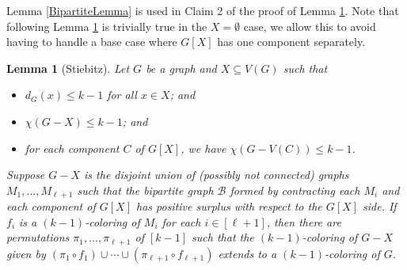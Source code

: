 \documentclass[12pt]{article}
\theoremstyle{plain}
\newtheorem{lem}[thm]{Lemma}
\theoremstyle{definition}
\theoremstyle{remark}
\newcommand{\fancy}[1]{\mathcal{#1}}
\newcommand{\B}{\fancy{B}}
\newcommand{\irange}[1]{\left[#1\right]}
\begin{document}
Lemma \ref{BipartiteLemma} is used in Claim 2 of the proof of Lemma \ref{WithPositiveSurplus}. Note that following Lemma \ref{WithPositiveSurplus} is trivially true in the $X = \emptyset$ case, we allow this to avoid having to handle a base case where $G[X]$ has one component separately.
\begin{lem}[Stiebitz]
Let $G$ be a graph and $X \subseteq V(G)$ such that
\begin{itemize}
\item $d_G(x) \le k - 1$ for all $x \in X$; and
\item $\chi(G-X) \le k-1$; and
\item for each component $C$ of $G[X]$, we have $\chi(G - V(C)) \le k - 1$.
\end{itemize}
Suppose $G-X$ is the disjoint union of (possibly not connected) graphs $M_1, \ldots, M_{\ell + 1}$ such that the bipartite graph $\B$ formed by contracting each $M_i$ and each component of $G[X]$ has positive surplus with respect to the $G[X]$ side.  If $f_i$ is a $(k-1)$-coloring of $M_i$ for each $i \in \irange{\ell + 1}$, then there are permutations $\pi_1, \ldots, \pi_{\ell + 1}$ of $\irange{k-1}$ such that the $(k-1)$-coloring of $G-X$ given by $(\pi_1 \circ f_1) \cup \cdots \cup (\pi_{\ell + 1} \circ f_{\ell + 1})$ extends to a $(k - 1)$-coloring of $G$.
\label{WithPositiveSurplus}
\end{lem}
\end{document}
